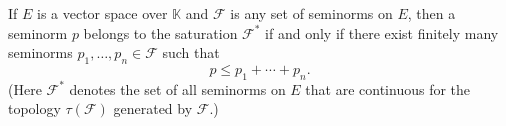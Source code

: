 If $E$ is a vector space over $\mathbb{K}$ and $\mathcal{F}$ is any set of seminorms on $E$, then a seminorm $p$ belongs to the saturation $\mathcal{F}^*$ if and only if there exist finitely many seminorms $p_1, \ldots, p_n \in \mathcal{F}$ such that
$$p \leq p_1 + \cdots + p_n.$$
(Here $\mathcal{F}^*$ denotes the set of all seminorms on $E$ that are continuous for the topology $\tau(\mathcal{F})$ generated by $\mathcal{F}$.)
